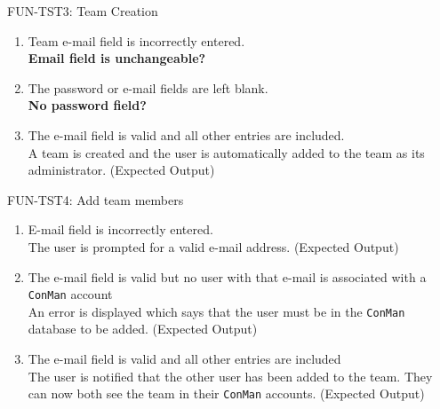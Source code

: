 \documentclass[12pt]{article}
\begin{document}
FUN-TST3: Team Creation
\begin{enumerate}
  \item Team e-mail field is incorrectly entered. \\
    \textbf{Email field is unchangeable?}
  \item The password or e-mail fields are left blank. \\
    \textbf{No password field?}
  \item The e-mail field is valid and all other entries are included. \\
    A team is created and the user is automatically added to the team as its administrator.  (Expected Output)
\end{enumerate}

FUN-TST4: Add team members
\begin{enumerate}
  \item E-mail field is incorrectly entered. \\
    The user is prompted for a valid e-mail address.  (Expected Output)
  \item The e-mail field is valid but no user with that e-mail is associated with a \verb|ConMan| account \\
    An error is displayed which says that the user must be in the \verb|ConMan| database to be added.  (Expected Output)
  \item The e-mail field is valid and all other entries are included \\
    The user is notified that the other user has been added to the team.  They can now both see the team in their \verb|ConMan| accounts.  (Expected Output)
\end{enumerate}
\end{document}
